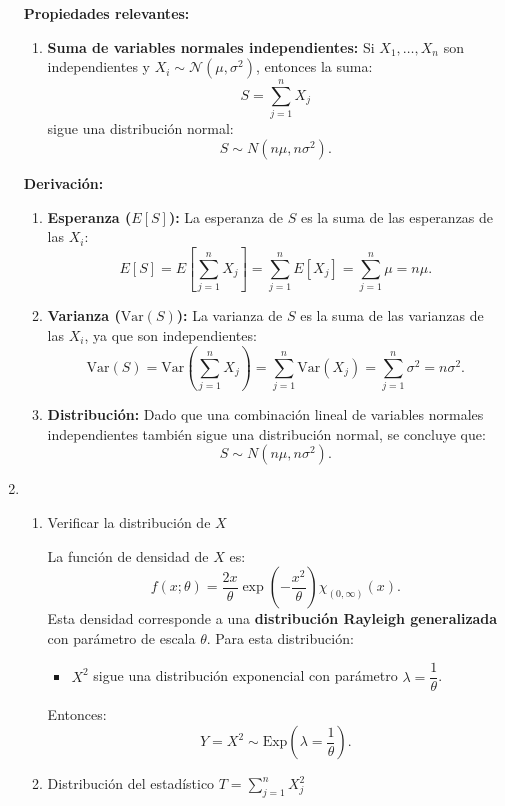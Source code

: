 \begin{enumerate}[label=\color{red}\textbf{\arabic*)}]
        \textbf{Propiedades relevantes:}
        \begin{enumerate}[label=\arabic*)]
            \item \textbf{Suma de variables normales independientes:} Si $X_1,\dots,X_n$ son independientes y $X_i\sim \mathcal{N}(\mu,\sigma^2)$, entonces la suma: \[
            S=\sum_{j=1}^{n} X_j
            \] sigue una distribución normal: \[
            S\sim N(n\mu,n\sigma^2).
            \] 
        \end{enumerate}
        \textbf{Derivación:}
        \begin{enumerate}[label=\arabic*)]
            \item \textbf{Esperanza ($E[S]$):} La esperanza de $S$ es la suma de las esperanzas de las  $X_i$:  \[
                    E[S]=E\left[ \sum_{j=1}^{n} X_j \right] =\sum_{j=1}^{n} E[X_j]=\sum_{j=1}^{n} \mu=n\mu.
            \] 
        \item \textbf{Varianza ($\mathrm{Var}(S)$):} La varianza de $S$ es la suma de las varianzas de las  $X_i$, ya que son independientes:  \[
        \mathrm{Var}(S)=\mathrm{Var}\left( \sum_{j=1}^{n} X_j \right) =\sum_{j=1}^{n} \mathrm{Var}(X_j)=\sum_{j=1}^{n} \sigma^2=n\sigma^2.
        \] 
    \item \textbf{Distribución:} Dado que una combinación lineal de variables normales independientes también sigue una distribución normal, se concluye que: \[
    S\sim N(n\mu,n\sigma^2).
    \]  
        \end{enumerate}
    \item {}

\begin{enumerate}[label=Paso \arabic*:]
    \item Verificar la distribución de $X$

        La función de densidad de  $X$ es:  \[
        f(x;\theta)=\dfrac{2x}{\theta}\exp\left( -\dfrac{x^2}{\theta} \right) \chi_{(0,\infty)}(x).
        \] 
        Esta densidad corresponde a una \textbf{distribución Rayleigh generalizada} con parámetro de escala $\theta$. Para esta distribución:
        \begin{itemize}[label=\textbullet]
            \item $X^2$ sigue una distribución exponencial con parámetro $\lambda=\dfrac{1}{\theta}$.
        \end{itemize}
        Entonces: \[
        Y=X^2\sim \mathrm{Exp}\left( \lambda=\dfrac{1}{\theta} \right) .
        \] 
    \item Distribución del estadístico $T=\sum_{j=1}^{n} X_j^2$ 


\end{enumerate}
\end{enumerate}

